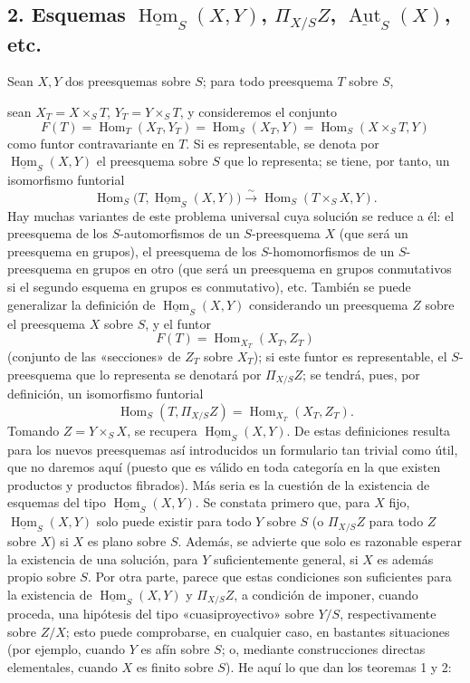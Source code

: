 \documentclass[11pt,twoside,openany]{book}
\numberwithin{equation}{section}
\newcommand{\src}[1]{%
  \phantomsection\hypertarget{src:#1}{}%
  \marginpar{\raggedleft\footnotesize\sffamily #1}%
}
\theoremstyle{plain}
\theoremstyle{definition}
\theoremstyle{remark}
\newcommand{\FgaUnitKey}{frontmatter}
\renewcommand{\src}[1]{%
  \phantomsection\hypertarget{src:\FgaUnitKey:#1}{}%
  \marginpar{\raggedleft\footnotesize\sffamily #1}%
}
\theoremstyle{plain}
\theoremstyle{definition}
\theoremstyle{remark}
\begin{document}
\subsection*{2. Esquemas $\underline{\operatorname{Hom}}_S(X,Y)$,
$\Pi_{X/S}Z$, $\underline{\operatorname{Aut}}_S(X)$, etc.}

Sean $X,Y$ dos preesquemas sobre $S$; para todo preesquema $T$ sobre $S$,

\src{381}
sean $X_T=X\times_ST$, $Y_T=Y\times_ST$, y consideremos el conjunto
\[
  F(T)=\operatorname{Hom}_T(X_T,Y_T)
      =\operatorname{Hom}_S(X_T,Y)
      =\operatorname{Hom}_S(X\times_ST,Y)
\]
como funtor contravariante en $T$. Si es representable, se denota por
$\underline{\operatorname{Hom}}_S(X,Y)$ el preesquema sobre $S$ que lo
representa; se tiene, por tanto, un isomorfismo funtorial
\[
  \operatorname{Hom}_S
  \bigl(T,\underline{\operatorname{Hom}}_S(X,Y)\bigr)
  \xrightarrow{\sim}
  \operatorname{Hom}_S(T\times_SX,Y).
\]
Hay muchas variantes de este problema universal cuya solución se reduce a él:
el preesquema de los $S$-automorfismos de un $S$-preesquema $X$ (que será un
preesquema en grupos), el preesquema de los $S$-homomorfismos de un
$S$-preesquema en grupos en otro (que será un preesquema en grupos conmutativos
si el segundo esquema en grupos es conmutativo), etc. También se puede
generalizar la definición de $\underline{\operatorname{Hom}}_S(X,Y)$
considerando un preesquema $Z$ sobre el preesquema $X$ sobre $S$, y el funtor
\[
  F(T)=\operatorname{Hom}_{X_T}(X_T,Z_T)
\]
(conjunto de las «secciones» de $Z_T$ sobre $X_T$); si este funtor es
representable, el $S$-preesquema que lo representa se denotará por
$\Pi_{X/S}Z$; se tendrá, pues, por definición, un isomorfismo funtorial
\[
  \operatorname{Hom}_S(T,\Pi_{X/S}Z)
  =\operatorname{Hom}_{X_T}(X_T,Z_T).
\]
Tomando $Z=Y\times_SX$, se recupera
$\underline{\operatorname{Hom}}_S(X,Y)$. De estas definiciones resulta para los
nuevos preesquemas así introducidos un formulario tan trivial como útil, que no
daremos aquí (puesto que es válido en toda categoría en la que existen
productos y productos fibrados). Más seria es la cuestión de la existencia de
esquemas del tipo $\underline{\operatorname{Hom}}_S(X,Y)$. Se constata primero
que, para $X$ fijo, $\underline{\operatorname{Hom}}_S(X,Y)$ solo puede existir
para todo $Y$ sobre $S$ (o $\Pi_{X/S}Z$ para todo $Z$ sobre $X$) si $X$ es plano
sobre $S$. Además, se advierte que solo es razonable esperar la existencia de
una solución, para $Y$ suficientemente general, si $X$ es además propio sobre
$S$. Por otra parte, parece que estas condiciones son suficientes para la
existencia de $\underline{\operatorname{Hom}}_S(X,Y)$ y $\Pi_{X/S}Z$, a
condición de imponer, cuando proceda, una hipótesis del tipo «cuasiproyectivo»
sobre $Y/S$, respectivamente sobre $Z/X$; esto puede comprobarse, en cualquier
caso, en bastantes situaciones (por ejemplo, cuando $Y$ es afín sobre $S$; o,
mediante construcciones directas elementales, cuando $X$ es finito sobre $S$).
He aquí lo que dan los teoremas 1 y 2:
\end{document}
